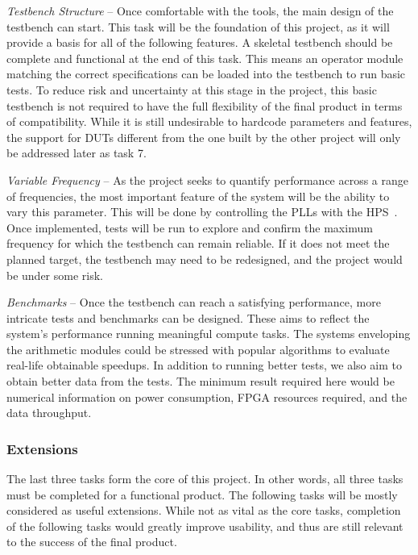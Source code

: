 \textit{Testbench Structure} --
Once comfortable with the tools, the main design of the testbench can start.
This task will be the foundation of this project, as it will provide a basis
for all of the following features.
A skeletal testbench should be complete and functional at the end of this
task.
This means an operator module matching the correct specifications can
be loaded into the testbench to run basic tests.
To reduce risk and uncertainty at this stage in the project, this basic
testbench is not required to have the full flexibility of the final product
in terms of compatibility.
While it is still undesirable to hardcode parameters and features,
the support for DUTs different from the one built by the other project will
only be addressed later as task 7.

\textit{Variable Frequency} --
As the project seeks to quantify performance across a range of frequencies,
the most important feature of the system will be the ability to vary this
parameter.
This will be done by controlling the PLLs with the HPS~\cite{Altera4}.
Once implemented, tests will be run to explore and confirm the maximum
frequency for which the testbench can remain reliable.
If it does not meet the planned target, the testbench may need to be redesigned,
and the project would be under some risk.


\textit{Benchmarks} --
Once the testbench can reach a satisfying performance, more intricate tests and
benchmarks can be designed.
These aims to reflect the system's performance running meaningful compute
tasks.
The systems enveloping the arithmetic modules could be stressed with popular
algorithms to evaluate real-life obtainable speedups.
In addition to running better tests, we also aim to obtain better data from
the tests.
The minimum result required here would be numerical information on power
consumption, FPGA resources required, and the data throughput.

\subsubsection{\textbf{Extensions}}

The last three tasks form the core of this project.
In other words, all three tasks must be completed for a functional product.
The following tasks will be mostly considered as useful extensions.
While not as vital as the core tasks, completion of the following tasks would
greatly improve usability, and thus are still relevant to the success
of the final product.

